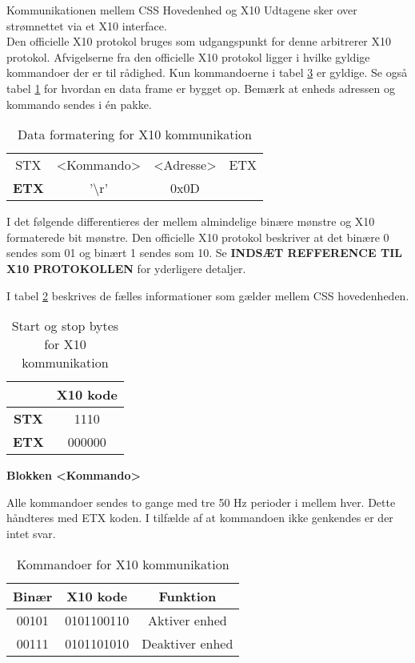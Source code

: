 Kommunikationen mellem CSS Hovedenhed og X10 Udtagene sker over strømnettet via et X10 interface.\\

Den officielle X10 protokol bruges som udgangspunkt for denne arbitrerer X10 protokol.
Afvigelserne fra den officielle X10 protokol ligger i hvilke gyldige kommandoer der er til rådighed. Kun kommandoerne i tabel \ref{tabel:X10Kommandoer} er gyldige. Se også tabel \ref{table:X10DataFormat} for hvordan en data frame er bygget op. Bemærk at   enheds adressen og kommando sendes i én pakke.

\begin{table}[h]
	\caption{Data formatering for X10 kommunikation}
	\centering
	\begin{tabular}{|c|c|c|c|}
		\hline 

		STX & <Kommando> & <Adresse> & ETX \\

		\textbf{ETX} & '\textbackslash r' & 0x0D \\ 
		\hline 
	\end{tabular} 
	\label{table:X10DataFormat}
\end{table}

I det følgende differentieres der mellem almindelige binære mønstre og X10 formaterede bit mønstre.
Den officielle X10 protokol beskriver at det binære 0 sendes som 01 og binært 1 sendes som 10. Se \textbf{INDSÆT REFFERENCE TIL X10 PROTOKOLLEN} for yderligere detaljer.

I tabel \ref{table:X10StartStopBytes} beskrives de fælles informationer som gælder mellem CSS hovedenheden.

\begin{table}[h]
	\caption{Start og stop bytes for X10 kommunikation}
	\centering
	\begin{tabular}{|c|c|}
		\hline 
		& \textbf{X10 kode} \\ 
		\hline 
		\textbf{STX} & 1110\\ 
		\hline 
		\textbf{ETX} & 000000 \\ 
		\hline 
	\end{tabular} 
	\label{table:X10StartStopBytes}
\end{table}

\textbf{Blokken <Kommando>}

Alle kommandoer sendes to gange med tre 50 Hz perioder i mellem hver. Dette håndteres med ETX koden.
I tilfælde af at kommandoen ikke genkendes er der intet svar.

\begin{table}[h]
\caption{Kommandoer for X10 kommunikation}
\centering
\begin{tabular}{|c|c|c|}
\hline 
\textbf{Binær} & \textbf{X10 kode} & \textbf{Funktion} \\ 
\hline 
00101 & 0101100110 & Aktiver enhed \\ 
\hline 
00111 & 0101101010 & Deaktiver enhed \\ 
\hline
\end{tabular}
\label{tabel:X10Kommandoer}
\end{table} 

